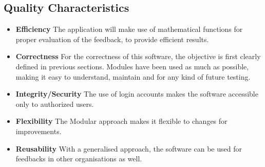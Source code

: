 \subsection{Quality Characteristics}
\begin{itemize}
    \item{\bf Efficiency}
	The application will make use of mathematical functions for proper
	evaluation of the feedback, to provide efficient results.

    \item{\bf Correctness}
	For the correctness of this software, the objective is first clearly 
	defined in previous sections. Modules have been used as much as 
	possible, making it easy to understand, maintain and for any kind of future testing.

    \item{\bf Integrity/Security}
	The use of login accounts makes the software accessible only to authorized users. 

    \item{\bf Flexibility}
	 The Modular approach makes it flexible to changes for improvements.

    \item{\bf Reusability}
	 With a generalised approach, the software can be used for feedbacks 
	in other organisations as well.

\end{itemize}


